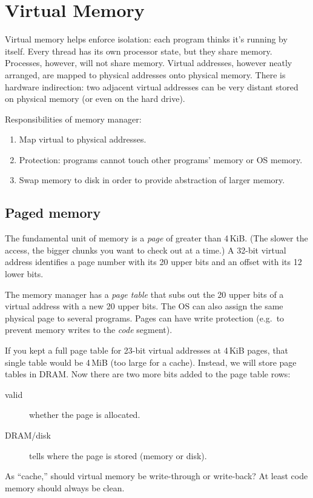\chapter{Virtual Memory}
Virtual memory helps enforce isolation: each program thinks it's running by itself.
Every thread has its own processor state, but they share memory.
Processes, however, will not share memory.
Virtual addresses, however neatly arranged, are mapped to physical addresses onto physical memory.
There is hardware indirection: two adjacent virtual addresses
can be very distant stored on physical memory (or even on the hard drive).

Responsibilities of memory manager:
\begin{enumerate}
	\item Map virtual to physical addresses.
	\item Protection: programs cannot touch other programs' memory or OS memory.
	\item Swap memory to disk in order to provide abstraction of larger memory. 
\end{enumerate}

\section{Paged memory}
The fundamental unit of memory is a \emph{page} of greater than 4\,KiB. (The slower the access, the bigger chunks you want to check out at a time.)
A 32-bit virtual address identifies a page number with its 20 upper bits and an offset with its 12 lower bits.

The memory manager has a \emph{page table} that subs out the 20 upper bits of a virtual address with a new 20 upper bits.
The OS can also assign the same physical page to several programs.
Pages can have write protection (e.g.~to prevent memory writes to the \emph{code} segment).

If you kept a full page table for 23-bit virtual addresses at 4\,KiB pages, that single table would be 4\,MiB (too large for a cache).
Instead, we will store page tables in DRAM. Now there are two more bits added to the page table rows:
\begin{description}
	\item[valid] whether the page is allocated.
	\item[DRAM/disk] tells where the page is stored (memory or disk).
\end{description}
As ``cache,'' should virtual memory be write-through or write-back?
At least code memory should always be clean.


